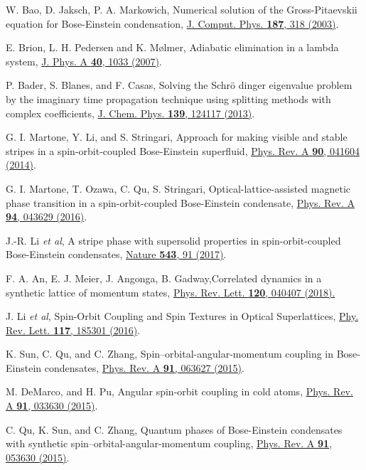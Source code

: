 \documentclass[twocolumn,prl,floatfix,citeautoscript,nofootinbib,superscriptaddress]{revtex4}
\begin{document}
\begin{thebibliography}{99}
 W. Bao, D. Jaksch, P. A. Markowich, {Numerical solution of
the Gross-Pitaevskii equation for Bose-Einstein condensation}, \href{https://doi.org/10.1016/S0021-9991(03)00102-5}%
{J. Comput. Phys. \textbf{187}, 318 (2003)}.


 E. Brion, L. H. Pedersen and K. M\o lmer, {Adiabatic
elimination in a lambda system}, \href{https://doi.org/doi:10.1088/1751-8113/40/5/011}%
{J. Phys. A \textbf{40}, 1033 (2007)}.


 P. Bader, S. Blanes, and F. Casas, {Solving the Schr\"{o}%
dinger eigenvalue problem by the imaginary time propagation technique using
splitting methods with complex coefficients}, \href{https://doi.org/10.1063/1.4821126}%
{J. Chem. Phys. \textbf{139}, 124117 (2013)}.


 G. I. Martone, Y. Li, and S. Stringari, {Approach for
making visible and stable stripes in a spin-orbit-coupled Bose-Einstein
superfluid}, \href{https://doi.org/10.1103/PhysRevA.90.041604}{Phys. Rev. A
\textbf{90}, 041604 (2014)}.

 G. I. Martone, T. Ozawa, C. Qu, S. Stringari, {%
Optical-lattice-assisted magnetic phase transition in a spin-orbit-coupled
Bose-Einstein condensate}, \href{https://doi.org/10.1103/PhysRevA.94.043629}{%
Phys. Rev. A \textbf{94}, 043629 (2016)}.

 J.-R. Li \textit{et al}, {A stripe phase with
supersolid properties in spin-orbit-coupled {B}ose-{E}instein condensates},
\href{http://doi.org/10.1038/nature21431}{Nature \textbf{543}, 91 (2017)}.


 F. A. An, E. J. Meier, J. Angonga, B. Gadway,{Correlated
dynamics in a synthetic lattice of momentum states}, \href{https://doi.org/10.1103/PhysRevLett.120.040407}%
{Phys. Rev. Lett. \textbf{120}, 040407 (2018).}

 J. Li \textit{et al}, {Spin-Orbit Coupling and Spin
Textures in Optical Superlattices}, \href{https://doi.org/10.1103/PhysRevLett.117.185301}%
{Phy. Rev. Lett. \textbf{117}, 185301 (2016)}.


 K. Sun, C. Qu, and C. Zhang, {%
Spin--orbital-angular-momentum coupling in Bose-Einstein condensates}, \href{http://dx.doi.org/10.1103/PhysRevA.91.063627}%
{Phys. Rev. A \textbf{91}, 063627 (2015)}.

 M. DeMarco, and H. Pu, {Angular spin-orbit coupling in
cold atoms}, \href{http://dx.doi.org/10.1103/PhysRevA.91.033630}{Phys. Rev.
A \textbf{91}, 033630 (2015)}.

 C. Qu, K. Sun, and C. Zhang, {Quantum phases of
Bose-Einstein condensates with synthetic spin--orbital-angular-momentum
coupling}, \href{http://dx.doi.org/10.1103/PhysRevA.91.053630}{Phys. Rev. A
\textbf{91}, 053630 (2015)}.
\end{thebibliography}
\end{document}
